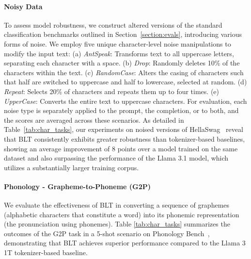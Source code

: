 \paragraph{Noisy Data} To assess model robustness, we construct altered versions of the standard classification benchmarks outlined in Section~\ref{section:evals}, introducing various forms of noise. We employ five unique character-level noise manipulations to modify the input text: (a) \textit{AntSpeak}: Transforms text to all uppercase letters, separating each character with a space. (b) \textit{Drop}: Randomly deletes 10\% of the characters within the text. (c) \textit{RandomCase}: Alters the casing of characters such that half are switched to uppercase and half to lowercase, selected at random. (d) \textit{Repeat}: Selects 20\% of characters and repeats them up to four times. (e) \textit{UpperCase}: Converts the entire text to uppercase characters. For evaluation, each noise type is separately applied to the prompt, the completion, or to both, and the scores are averaged across these scenarios. As detailed in Table~\ref{tab:char_tasks}, our experiments on noised versions of HellaSwag~\citep{Eval_hellaswag} reveal that {\textsc BLT} consistently exhibits greater robustness than tokenizer-based baselines, showing an average improvement of 8 points over a model trained on the same dataset and also surpassing the performance of the Llama 3.1 model, which utilizes a substantially larger training corpus.

\paragraph{Phonology - Grapheme-to-Phoneme (G2P)} We evaluate the effectiveness of {\textsc BLT} in converting a sequence of graphemes (alphabetic characters that constitute a word) into its phonemic representation (the pronunciation using phonemes). Table \ref{tab:char_tasks} summarizes the outcomes of the G2P task in a 5-shot scenario on Phonology Bench~\citep{suvarna2024phonologybench}, demonstrating that {\textsc BLT} achieves superior performance compared to the Llama 3 1T tokenizer-based baseline.

